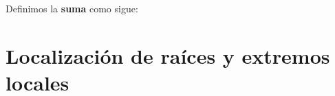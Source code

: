 \documentclass[8pt,a4paper]{extarticle}
\begin{document}
\begin{multicols}{3}
\vspace{7cm}

\begin{boxdef}
	Definimos la \textbf{suma} como sigue: \\
	\begin{algorithm}[H]

	\end{algorithm}
\end{boxdef}

\newpage

\section{Localización de raíces y extremos locales}

\vfill\eject
\columnbreak
\end{multicols}
\end{document}
